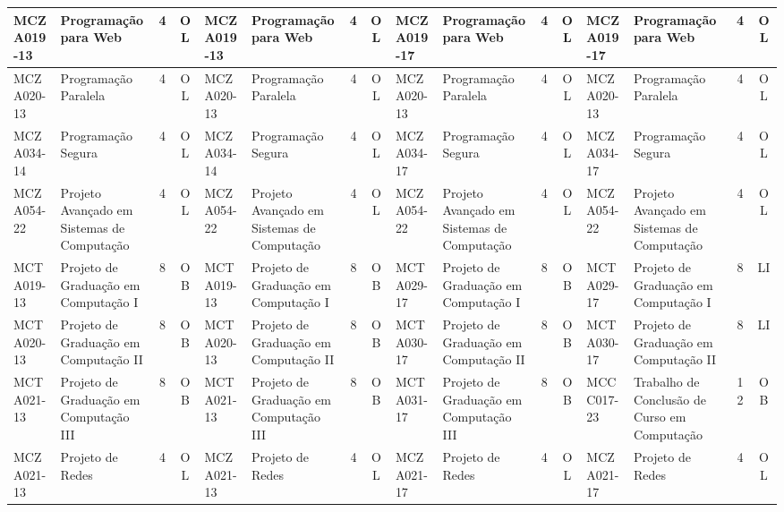 \documentclass[a4paper]{article}
\begin{document}
\begin{landscape}
{\begin{longtable}{|l|p{.15\textheight}|c|c||l|p{.15\textheight}|c|c||l|p{.15\textheight}|c|c||l|p{.15\textheight}|c|c|}
    MCZA019-13 & Programação para Web & 4 & OL &
    MCZA019-13 & Programação para Web & 4 & OL &
    MCZA019-17 & Programação para Web & 4 & OL &
    MCZA019-17 & Programação para Web & 4 & OL \\ \hline
    
    MCZA020-13 & Programação Paralela & 4 & OL &
    MCZA020-13 & Programação Paralela & 4 & OL &
    MCZA020-13 & Programação Paralela & 4 & OL & 
    MCZA020-13 & Programação Paralela & 4 & OL \\ \hline
    
    MCZA034-14 & Programação Segura & 4 & OL &
    MCZA034-14 & Programação Segura & 4 & OL &
    MCZA034-17 & Programação Segura & 4 & OL &
    MCZA034-17 & Programação Segura & 4 & OL \\ \hline
    
    MCZA054-22 & Projeto Avançado em Sistemas de Computação & 4 & OL &
    MCZA054-22 & Projeto Avançado em Sistemas de Computação & 4 & OL &
    MCZA054-22 & Projeto Avançado em Sistemas de Computação & 4 & OL &
    MCZA054-22 & Projeto Avançado em Sistemas de Computação & 4 & OL \\ \hline

    
    MCTA019-13 & Projeto de Graduação em Computação I & 8 & OB &
    MCTA019-13 & Projeto de Graduação em Computação I & 8 & OB &
    MCTA029-17 & Projeto de Graduação em Computação I & 8 & OB &
    MCTA029-17 & Projeto de Graduação em Computação I & 8 & LI \\ \hline

    MCTA020-13 & Projeto de Graduação em Computação II & 8 & OB &
    MCTA020-13 & Projeto de Graduação em Computação II & 8 & OB &
    MCTA030-17 & Projeto de Graduação em Computação II & 8 & OB &
    MCTA030-17 & Projeto de Graduação em Computação II & 8 & LI \\ \hline

    MCTA021-13 & Projeto de Graduação em Computação III & 8 & OB &
    MCTA021-13 & Projeto de Graduação em Computação III & 8 & OB &
    MCTA031-17 & Projeto de Graduação em Computação III & 8 & OB &
    MCCC017-23 & Trabalho de Conclusão de Curso em Computação & 12 & OB \\ \hline

    MCZA021-13 & Projeto de Redes & 4 & OL &
    MCZA021-13 & Projeto de Redes & 4 & OL &
    MCZA021-17 & Projeto de Redes & 4 & OL &
    MCZA021-17 & Projeto de Redes & 4 & OL \\ \hline


\end{longtable}}
\end{landscape}
\end{document}
